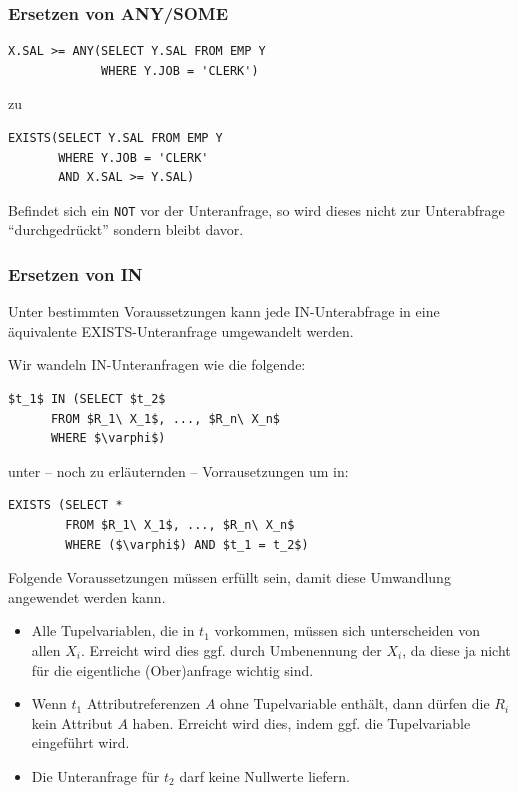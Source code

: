 \subsubsection*{Ersetzen von ANY/SOME}

\begin{verbatim}
X.SAL >= ANY(SELECT Y.SAL FROM EMP Y 
             WHERE Y.JOB = 'CLERK')
\end{verbatim} zu
\begin{verbatim}
EXISTS(SELECT Y.SAL FROM EMP Y 
       WHERE Y.JOB = 'CLERK' 
       AND X.SAL >= Y.SAL)
\end{verbatim}

Befindet sich ein \verb|NOT| vor der Unteranfrage, so wird dieses nicht zur Unterabfrage ``durchgedrückt'' sondern bleibt davor.

\subsubsection{Ersetzen von IN}

Unter bestimmten Voraussetzungen kann jede IN-Unterabfrage in eine äquivalente EXISTS-Unteranfrage umgewandelt werden.

Wir wandeln IN-Unteranfragen wie die folgende:

\begin{lstlisting}[mathescape]
$t_1$ IN (SELECT $t_2$
      FROM $R_1\ X_1$, ..., $R_n\ X_n$
      WHERE $\varphi$)
\end{lstlisting}

unter -- noch zu erläuternden -- Vorrausetzungen um in:

\begin{lstlisting}[mathescape]
EXISTS (SELECT *
        FROM $R_1\ X_1$, ..., $R_n\ X_n$
        WHERE ($\varphi$) AND $t_1 = t_2$)
\end{lstlisting}

Folgende Voraussetzungen müssen erfüllt sein, damit diese Umwandlung angewendet werden kann.

\begin{itemize}
\item Alle Tupelvariablen, die in $t_1$ vorkommen, müssen sich unterscheiden von allen $X_i$. Erreicht wird dies ggf. durch Umbenennung der $X_i$, da diese ja nicht für die eigentliche (Ober)anfrage wichtig sind.
\item Wenn $t_1$ Attributreferenzen $A$ ohne Tupelvariable enthält, dann dürfen die $R_i$ kein Attribut $A$ haben. Erreicht wird dies, indem ggf. die Tupelvariable eingeführt wird.
\item Die Unteranfrage für $t_2$ darf keine Nullwerte liefern.
\end{itemize}

